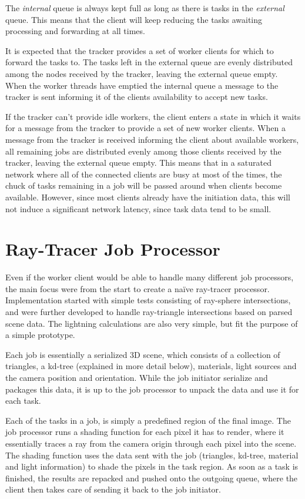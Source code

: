The \textit{internal} queue is always kept full as long as there is tasks in the
\textit{external} queue. This means that the client will keep reducing the tasks
awaiting processing and forwarding at all times.

It is expected that the tracker provides a set of worker clients for which to
forward the tasks to. The tasks left in the external queue are evenly
distributed among the nodes received by the tracker, leaving the external queue
empty. When the worker threads have emptied the internal queue a message to the
tracker is sent informing it of the clients availability to accept new tasks.

If the tracker can't provide idle workers, the client enters a state in which it
waits for a message from the tracker to provide a set of new worker clients. When a
message from the tracker is received informing the client about available workers,
all remaining jobs are distributed evenly among those clients received by the 
tracker, leaving the external queue empty. This means that in a saturated
network where all of the connected clients are busy at most of the times, the
chuck of tasks remaining in a job will be passed around when clients become
available. However, since most clients already have the initiation data, this
will not induce a significant network latency, since task data tend to be small.


\section{Ray-Tracer Job Processor}
Even if the worker client would be able to handle many different job processors, the main focus were from the start to create a naïve ray-tracer processor. Implementation started with simple tests consisting of ray-sphere intersections, and were further developed to handle ray-triangle intersections based on parsed scene data. The lightning calculations are also very simple, but fit the purpose of a simple prototype.

Each job is essentially a serialized 3D scene, which consists of a collection of triangles, a kd-tree (explained in more detail below), materials, light sources and the camera position and orientation. While the job initiator serialize and packages this data, it is up to the job processor to unpack the data and use it for each task.

Each of the tasks in a job, is simply a predefined region of the final image. The job processor runs a shading function for each pixel it has to render, where it essentially traces a ray from the camera origin through each pixel into the scene. The shading function uses the data sent with the job (triangles, kd-tree, material and light information) to shade the pixels in the task region. As soon as a task is finished, the results are repacked and pushed onto the outgoing queue, where the client then takes care of sending it back to the job initiator.

